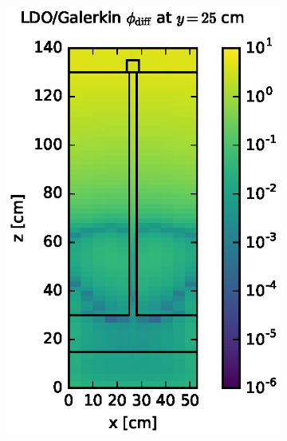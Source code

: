\begin{figure}[!htb]
\begin{subfigure}{0.4\textwidth}
\includegraphics[max height=0.445\textheight]
{img/steel-plots/fwd/flux-diff-rel-gkn04.eps}
\end{subfigure}
\\
\begin{subfigure}{0.4\textwidth}

\end{subfigure}
\end{figure}
